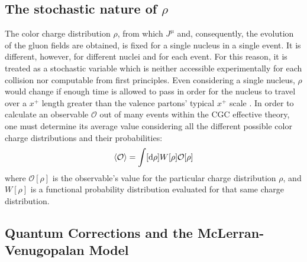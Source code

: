 \subsection{The stochastic nature of $\rho$}
The color charge distribution $\rho$, from which $J^\mu$ and, consequently, the evolution of the gluon fields are obtained, is fixed for a single nucleus in a single event. It is different, however, for different nuclei and for each event. For this reason, it is treated as a stochastic variable \cite{Gelis_2010} which is neither accessible experimentally for each collision nor computable from first principles.  Even considering a single nucleus, $\rho$ would change if enough time is allowed to pass in order for the nucleus to travel over a $x^+$ length greater than the valence partons' typical $x^+$ scale \cite{Gelis_Habilitation}. In order to calculate an observable $\mathcal{O}$ out of many events within the \gls{CGC} effective theory, one must determine its average value considering all the different possible color charge distributions and their probabilities: \cite{Gelis_2010}
\begin{equation}
	\left< \mathcal{O} \right> = \int [\mathop{}\!\mathrm{d} \rho] W[\rho] \mathcal{O}[\rho]
\end{equation}
where $\mathcal{O}[\rho]$ is the observable's value for the particular charge distribution $\rho$, and $W[\rho]$ is a functional probability distribution evaluated for that same charge distribution.%

\subsection{Quantum Corrections and the McLerran-Venugopalan Model}

